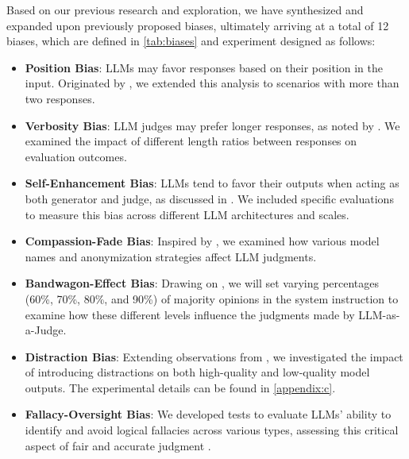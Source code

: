 \documentclass{article} %
\begin{document}
Based on our previous research and exploration, we have synthesized and expanded upon previously proposed biases, ultimately arriving at a total of 12 biases, which are defined in \autoref{tab:biases} and experiment designed as follows:



\begin{itemize}[leftmargin=*, itemsep=0.3pt, parsep=0pt]
\item\textbf{Position Bias}: LLMs may favor responses based on their position in the input. Originated by \citet{zheng2024judging}, we extended this analysis to scenarios with more than two responses.

\item\textbf{Verbosity Bias}: LLM judges may prefer longer responses, as noted by \citet{zheng2024judging}. We examined the impact of different length ratios between responses on evaluation outcomes.

\item\textbf{Self-Enhancement Bias}: LLMs tend to favor their outputs when acting as both generator and judge, as discussed in \citet{zheng2024judging}. We included specific evaluations to measure this bias across different LLM architectures and scales.

\item\textbf{Compassion-Fade Bias}: Inspired by \citet{koo2023benchmarkingcognitivebiaseslarge}, we examined how various model names and anonymization strategies affect LLM judgments.

\item\textbf{Bandwagon-Effect Bias}: Drawing on \citet{koo2023benchmarkingcognitivebiaseslarge}, we will set varying percentages (60\%, 70\%, 80\%, and 90\%) of majority opinions in the system instruction to examine how these different levels influence the judgments made by LLM-as-a-Judge.

\item\textbf{Distraction Bias}: Extending observations from \citet{koo2023benchmarkingcognitivebiaseslarge}, we investigated the impact of introducing distractions on both high-quality and low-quality model outputs. The experimental details can be found in \autoref{appendix:c}.

\item\textbf{Fallacy-Oversight Bias}: We developed tests to evaluate LLMs' ability to identify and avoid logical fallacies across various types, assessing this critical aspect of fair and accurate judgment \citep{chen2024humansllmsjudgestudy}.


\end{itemize}
\end{document}

